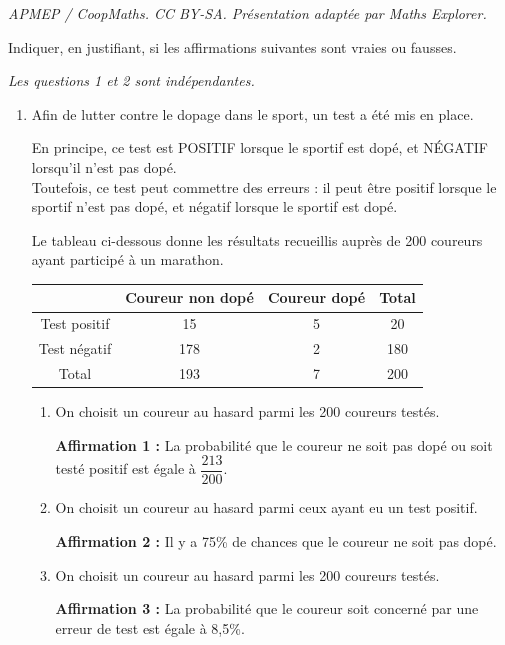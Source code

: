 \documentclass[10pt]{article}
\begin{document}
\noindent\textit{APMEP / CoopMaths. CC BY-SA. Présentation adaptée par Maths Explorer.}\par\medskip
Indiquer, en justifiant, si les affirmations suivantes sont vraies ou fausses.

\centering \textit{Les questions 1 et 2 sont indépendantes.}

\begin{enumerate}
\item Afin de lutter contre le dopage dans le sport, un test a été mis en place.

En principe, ce test est POSITIF lorsque le sportif est dopé, et NÉGATIF lorsqu'il n'est pas dopé. \\
Toutefois, ce test peut commettre des erreurs : il peut être positif lorsque le sportif n'est pas dopé, et négatif lorsque le sportif est dopé.

Le tableau ci-dessous donne les résultats recueillis auprès de 200 coureurs ayant participé à un marathon.

\begin{center}
\begin{tabular}{|c|c|c|c|}
\hline
 & Coureur non dopé & Coureur dopé & Total \\
\hline
Test positif & 15 & 5 & 20 \\
\hline
Test négatif & 178 & 2 & 180 \\
\hline
Total & 193 & 7 & 200 \\
\hline
\end{tabular}
\end{center}

\begin{enumerate}
\item On choisit un coureur au hasard parmi les 200 coureurs testés.

\textbf{Affirmation 1 :} La probabilité que le coureur ne soit pas dopé ou soit testé positif est égale à $\dfrac{213}{200}$.

\item On choisit un coureur au hasard parmi ceux ayant eu un test positif.

\textbf{Affirmation 2 :} Il y a 75\% de chances que le coureur ne soit pas dopé.

\item On choisit un coureur au hasard parmi les 200 coureurs testés.

\textbf{Affirmation 3 :} La probabilité que le coureur soit concerné par une erreur de test est égale à 8,5\%.
\end{enumerate}


\end{enumerate}
\end{document}
